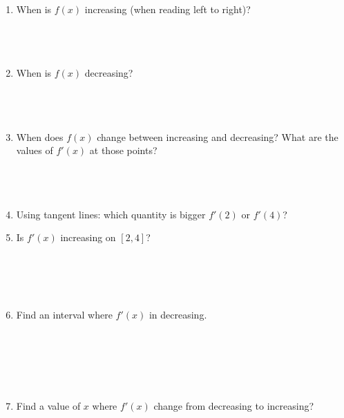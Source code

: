 \documentclass[12pt]{article}
\begin{document}
\begin{multicols}{2}
\begin{enumerate}[label= (\alph*)]
\item When is $f(x)$ increasing (when reading left to right)?\\\\\\\\
\item When is $f(x)$ decreasing?\\\\\\\\
\item When does $f(x)$ change between increasing and decreasing? What are the values of $f'(x)$ at those points?\\\\\\\\
\item Using tangent lines: which quantity is bigger $f'(2)$ or $f'(4)$?
\item Is $f'(x)$ increasing on $[2,4]$?\\\\\\\\\\
\item Find an interval where $f'(x)$ in decreasing.\\\\\\\\\\\\
\item Find a value of $x$ where $f'(x)$ change from decreasing to increasing?\\\\\\\\
\end{enumerate}
\end{multicols}
\newpage
\end{document}
